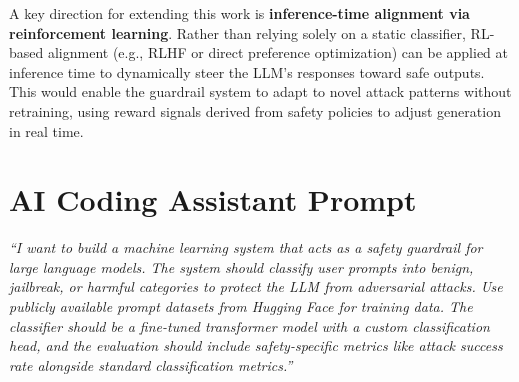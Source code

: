 \documentclass[11pt]{article}
\begin{document}
A key direction for extending this work is \textbf{inference-time alignment via reinforcement learning}. Rather than relying solely on a static classifier, RL-based alignment (e.g., RLHF or direct preference optimization) can be applied at inference time to dynamically steer the LLM's responses toward safe outputs. This would enable the guardrail system to adapt to novel attack patterns without retraining, using reward signals derived from safety policies to adjust generation in real time.

\section*{AI Coding Assistant Prompt}

\textit{``I want to build a machine learning system that acts as a safety guardrail for large language models. The system should classify user prompts into benign, jailbreak, or harmful categories to protect the LLM from adversarial attacks. Use publicly available prompt datasets from Hugging Face for training data. The classifier should be a fine-tuned transformer model with a custom classification head, and the evaluation should include safety-specific metrics like attack success rate alongside standard classification metrics.''}
\end{document}
